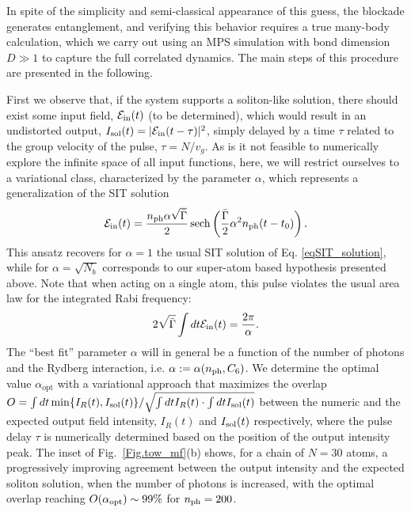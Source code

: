 \documentclass[pra,twocolumn,showpacs,preprintnumbers,amsmath,amssymb]{revtex4-1}
\begin{document}
In spite of the simplicity and semi-classical appearance of this guess, the blockade generates entanglement, and verifying this behavior requires a true many-body calculation, which we carry out using an MPS simulation with bond dimension $D\gg 1$ to capture the full correlated dynamics. The main steps of this procedure are presented in the following.



First we observe that, if the system supports a soliton-like solution, there should exist some input field, $\mathcal{E}_{\rm in}(t)$ (to be determined), which would result in an undistorted output, $I_{\rm sol}(t)=|\mathcal{E}_{\rm in}(t-\tau)|^2$, simply delayed by a time $\tau$ related to the group velocity of the pulse, $\tau=N/v_g$. As is it not feasible to numerically explore the infinite space of all input functions, here, we will restrict ourselves to a variational class, characterized by the parameter $\alpha$, which represents a generalization of the SIT solution
 \begin{equation}\label{ansatz_Rydberg}
\mathcal{E}_{\rm in}(t)=\frac{n_{\rm ph}\alpha\sqrt{\bar\Gamma}}{2}\operatorname{sech}\left(\frac{\bar\Gamma}{2}\alpha^2n_{\rm ph}(t-t_0)\right).
\end{equation}
This ansatz  recovers for $\alpha=1$ the usual SIT solution of Eq. \eqref{eqSIT_solution}, while for $\alpha=\sqrt{N_b}$ corresponds to our super-atom based hypothesis presented above.
Note that when acting on a single atom, this pulse violates the usual area law for the integrated Rabi frequency:
\begin{equation}
2\sqrt{\bar \Gamma}\int dt \mathcal{E}_{\rm in}(t)=\frac{2\pi}{\alpha}.\label{eq:SITarealaw}
\end{equation}
The ``best fit'' parameter $\alpha$ will in general be a function of the number of photons and the Rydberg interaction, i.e. $\alpha:=\alpha(n_{\rm ph},C_6)$. We determine the optimal value $\alpha_{\textrm{opt}}$  with a variational approach   that maximizes the overlap  $O=\int dt \,{\rm min}\{I_R(t),I_{\rm sol}(t)\}/\sqrt{\int dt I_R(t)\cdot\int dt I_{\rm sol}(t)}$ between the numeric and the expected output field intensity, $I_R(t)$ and  $I_{\rm sol}(t)$ respectively, where the pulse delay $\tau$ is numerically determined based on the position of the output intensity peak.
The inset of Fig.~\ref{Fig.tow_mf}(b) shows, for a chain of $N=30$ atoms, a progressively improving agreement between the output intensity and the expected soliton solution, when the number of photons is increased, with the optimal overlap reaching $O(\alpha_{\rm opt})\sim 99\%$ for $n_{\rm ph}=200$.
\end{document}
